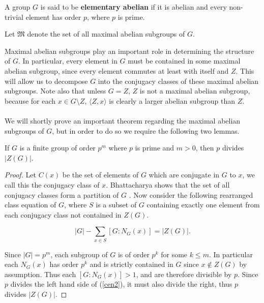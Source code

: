 \begin{definition}
\label{IsElementaryAbelian}
\leanok
A group $G$ is said to be \textbf{elementary abelian} if it is abelian and every non-trivial element has order $p$, where $p$ is prime.
\end{definition}

\begin{definition}
\label{MaximalAbelianSubgroups}
\leanok
Let $\mathfrak{M}$ denote the set of all maximal abelian subgroups of $G$.
\end{definition}
\vspace{3mm}

Maximal abelian subgroups play an important role in determining the structure of $G$. In particular, every element in $G$ must be contained in some maximal abelian subgroup, since every element commutes at least with itself and $Z$. This will allow us to decompose $G$ into the conjugacy classes of these maximal abelian subgroups. Note also that unless $G=Z$, $Z$ is not a maximal abelian subgroup, because for each $x \in G \! \setminus \! Z$, $\langle Z,x \rangle$ is clearly a larger abelian subgroup than $Z$. \\
\\
We will shortly prove an important theorem regarding the maximal abelian subgroups of $G$, but in order to do so we require the following two lemmas. \\

\begin{lemma}
\label{primecentre}
If $G$ is a finite group of order $p^m$ where $p$ is prime and $m>0$, then $p$ divides $|Z(G)|$. 
\end{lemma}

\begin{proof}
Let $C(x)$ be the set of elements of $G$ which are conjugate in $G$ to $x$, we call this the conjugacy class of $x$. Bhattacharya shows that the set of all conjugacy classes form a partition of $G$ \cite[p.112]{bhattacharya}. Now consider the following rearranged class equation of $G$, where $S$ is a subset of $G$ containing exactly one element from each conjugacy class not contained in $Z(G)$. 
 
\begin{equation} \label{cen2}
|G| - \sum_{x \in S} [G:N_G(x)] = |Z(G)|.
\end{equation}

Since $|G| = p^m$, each subgroup of $G$ is of order $p^k$ for some $k \leq m$. In particular each $N_G(x)$ has order $p^k$ and is strictly contained in $G$ since $x \not \in Z(G)$ by assumption. Thus each $[G:N_G(x)] > 1$, and are therefore divisible by $p$. Since $p$ divides the left hand side of (\ref{cen2}), it must also divide the right, thus $p$ divides $|Z(G)|$. 

\end{proof}


